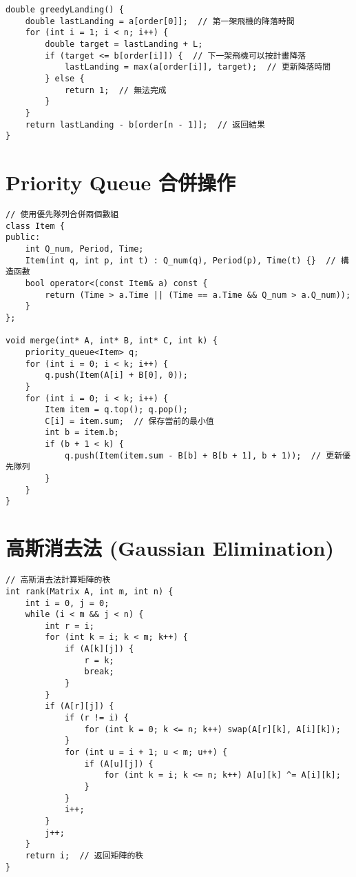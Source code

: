 \documentclass{article}
\begin{document}
\begin{multicols}{2}
\begin{lstlisting}
double greedyLanding() {
    double lastLanding = a[order[0]];  // 第一架飛機的降落時間
    for (int i = 1; i < n; i++) {
        double target = lastLanding + L;
        if (target <= b[order[i]]) {  // 下一架飛機可以按計畫降落
            lastLanding = max(a[order[i]], target);  // 更新降落時間
        } else {
            return 1;  // 無法完成
        }
    }
    return lastLanding - b[order[n - 1]];  // 返回結果
}
\end{lstlisting}

\section{Priority Queue 合併操作}

\begin{lstlisting}
// 使用優先隊列合併兩個數組
class Item {
public:
    int Q_num, Period, Time;
    Item(int q, int p, int t) : Q_num(q), Period(p), Time(t) {}  // 構造函數
    bool operator<(const Item& a) const {
        return (Time > a.Time || (Time == a.Time && Q_num > a.Q_num));
    }
};

void merge(int* A, int* B, int* C, int k) {
    priority_queue<Item> q;
    for (int i = 0; i < k; i++) {
        q.push(Item(A[i] + B[0], 0));
    }
    for (int i = 0; i < k; i++) {
        Item item = q.top(); q.pop();
        C[i] = item.sum;  // 保存當前的最小值
        int b = item.b;
        if (b + 1 < k) {
            q.push(Item(item.sum - B[b] + B[b + 1], b + 1));  // 更新優先隊列
        }
    }
}
\end{lstlisting}

\section{高斯消去法 (Gaussian Elimination)}

\begin{lstlisting}
// 高斯消去法計算矩陣的秩
int rank(Matrix A, int m, int n) {
    int i = 0, j = 0;
    while (i < m && j < n) {
        int r = i;
        for (int k = i; k < m; k++) {
            if (A[k][j]) {
                r = k;
                break;
            }
        }
        if (A[r][j]) {
            if (r != i) {
                for (int k = 0; k <= n; k++) swap(A[r][k], A[i][k]);
            }
            for (int u = i + 1; u < m; u++) {
                if (A[u][j]) {
                    for (int k = i; k <= n; k++) A[u][k] ^= A[i][k];
                }
            }
            i++;
        }
        j++;
    }
    return i;  // 返回矩陣的秩
}
\end{lstlisting}


\end{multicols}
\end{document}
